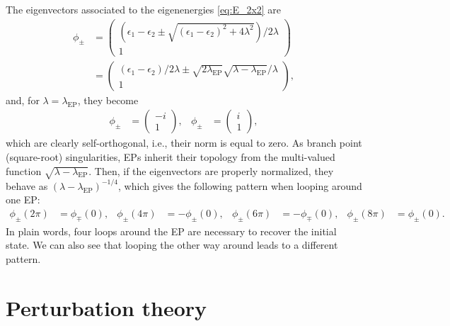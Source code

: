 \documentclass[11pt,a4paper]{article}
\begin{document}
The eigenvectors associated to the eigenenergies \eqref{eq:E_2x2} are
\begin{equation}\label{eq:phi_2x2}
\begin{split}
	\phi_{\pm}
	& = 
	\begin{pmatrix}
		(\epsilon_1 - \epsilon_2 \pm \sqrt{(\epsilon_1 - \epsilon_2)^2 + 4\lambda^2})/2\lambda 
		\\ 
		1
	\end{pmatrix}
	\\
	& =
	\begin{pmatrix}
		(\epsilon_1-\epsilon_2)/2\lambda \pm \sqrt{2\lambda_\text{EP}} \sqrt{\lambda - \lambda_\text{EP}}/\lambda 
		\\ 
		1
	\end{pmatrix},
\end{split}
\end{equation}
and, for $\lambda=\lambda_\text{EP}$, they become
\begin{align}
	\phi_{\pm} & = \begin{pmatrix} -i \\ 1\end{pmatrix},
	&
	\phi_{\pm} & = \begin{pmatrix} i \\ 1\end{pmatrix},
\end{align}
which are clearly self-orthogonal, i.e., their norm is equal to zero. 
As branch point (square-root) singularities, EPs inherit their topology from the multi-valued function $\sqrt{\lambda - \lambda_\text{EP}}$. 
Then, if the eigenvectors are properly normalized, they behave as $(\lambda - \lambda_\text{EP})^{-1/4}$, which gives the following pattern when looping around one EP:
\begin{align}
	\phi_{\pm}(2\pi) & = \phi_{\mp}(0),
	&
	\phi_{\pm}(4\pi) & = -\phi_{\pm}(0), 
	&
	\phi_{\pm}(6\pi) & = -\phi_{\mp}(0),
	&
	\phi_{\pm}(8\pi) & = \phi_{\pm}(0).
\end{align}
In plain words, four loops around the EP are necessary to recover the initial state. 
We can also see that looping the other way around leads to a different pattern.

\section{Perturbation theory}
\end{document}

